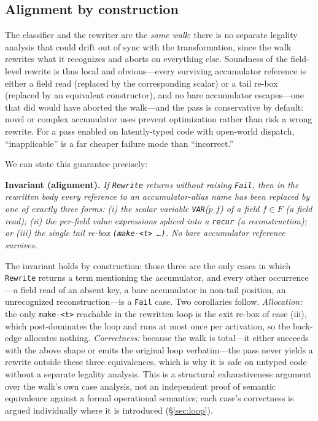 \documentclass[sigplan,screen,review,anonymous]{acmart}
\begin{document}
\subsection{Alignment by construction}
\label{sec:align}

The classifier and the rewriter are the \emph{same walk}: there is no separate
legality analysis that could drift out of sync with the
transformation, since the walk rewrites what it recognizes and aborts on
everything else. Soundness of the field-level rewrite is thus local and
obvious---every surviving accumulator reference is either a field read
(replaced by the corresponding scalar) or a tail re-box (replaced by an
equivalent constructor), and no bare accumulator escapes---one that
did would have aborted the walk---and the pass is conservative by
default: novel or complex accumulator uses prevent optimization
rather than risk a wrong rewrite. For a pass enabled on latently-typed
code with open-world dispatch, ``inapplicable'' is a far cheaper failure
mode than ``incorrect.''

We can state this guarantee precisely:

\noindent\textbf{Invariant (alignment).} \emph{If \texttt{Rewrite} returns
without raising \texttt{Fail}, then in the rewritten body every reference
to an accumulator-alias name has been
replaced by one of exactly three forms: (i) the scalar variable
\texttt{VAR}($p\_f$) of a field $f\in F$ (a field read); (ii) the per-field value
expressions spliced into a \texttt{recur} (a reconstruction); or (iii) the single
tail re-box \texttt{(make-<t> \ldots)}. No bare accumulator reference survives.}

\noindent The invariant holds by construction: those three are the only cases in
which \texttt{Rewrite} returns a term mentioning the accumulator, and every other
occurrence---a field read of an absent key, a bare accumulator in non-tail
position, an unrecognized reconstruction---is a \texttt{Fail} case. Two
corollaries follow. \emph{Allocation:} the only \texttt{make-<t>} reachable in the
rewritten loop is the exit re-box of case (iii), which post-dominates the loop and
runs at most once per activation, so the back-edge allocates nothing.
\emph{Correctness:} because the walk is total---it either succeeds with the
above shape or emits the original loop verbatim---the pass never yields a rewrite
outside these three equivalences, which is why it is safe on
untyped code without a separate legality analysis. This is a structural
exhaustiveness argument over the walk's own case analysis, not an
independent proof of semantic equivalence against a formal operational
semantics; each case's correctness is argued individually where it is
introduced (\S\ref{sec:loop}).
\end{document}
